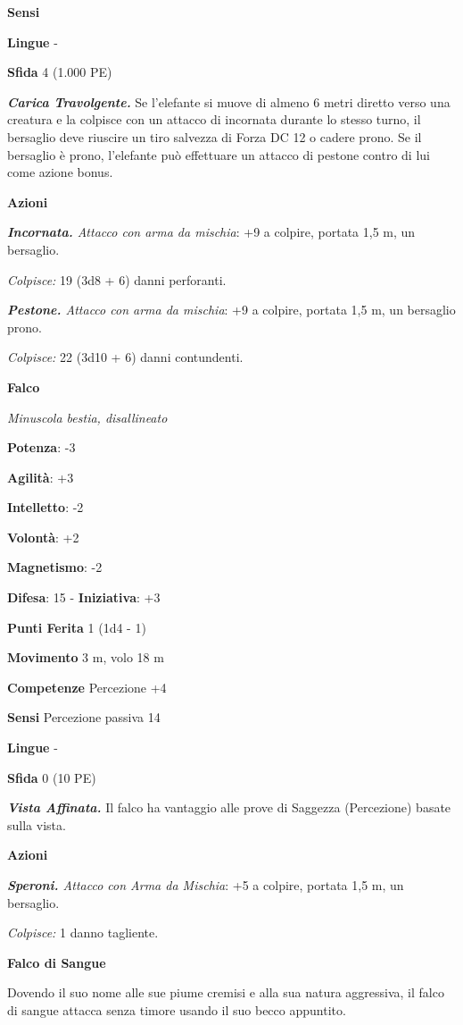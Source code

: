\begin{multicols}{2}
\textbf{Sensi} 

\textbf{Lingue} -

\textbf{Sfida} 4 (1.000 PE)

\emph{\textbf{Carica Travolgente.}} Se l'elefante si muove di almeno 6
metri diretto verso una creatura e la colpisce con un attacco di
incornata durante lo stesso turno, il bersaglio deve riuscire un tiro
salvezza di Forza DC 12 o cadere prono. Se il bersaglio è prono,
l'elefante può effettuare un attacco di pestone contro di lui come
azione bonus.

\textbf{Azioni}

\emph{\textbf{Incornata.} Attacco con arma da mischia}: +9 a colpire,
portata 1,5 m, un bersaglio.

\emph{Colpisce:} 19 (3d8 + 6) danni perforanti.

\emph{\textbf{Pestone.} Attacco con arma da mischia}: +9 a colpire,
portata 1,5 m, un bersaglio prono.

\emph{Colpisce:} 22 (3d10 + 6) danni contundenti.

\textbf{Falco}

\emph{Minuscola bestia, disallineato}

\textbf{Potenza}: -3

\textbf{Agilità}: +3

\textbf{Intelletto}: -2

\textbf{Volontà}: +2

\textbf{Magnetismo}: -2

\textbf{Difesa}: 15 - \textbf{Iniziativa}: +3

\textbf{Punti Ferita} 1 (1d4 - 1)

\textbf{Movimento} 3 m, volo 18 m

\textbf{Competenze} Percezione +4

\textbf{Sensi} Percezione passiva 14

\textbf{Lingue} -

\textbf{Sfida} 0 (10 PE)

\emph{\textbf{Vista Affinata.}} Il falco ha vantaggio alle prove di
Saggezza (Percezione) basate sulla vista.

\textbf{Azioni}

\emph{\textbf{Speroni.} Attacco con Arma da Mischia}: +5 a colpire,
portata 1,5 m, un bersaglio.

\emph{Colpisce:} 1 danno tagliente.

\textbf{Falco di Sangue}

Dovendo il suo nome alle sue piume cremisi e alla sua natura aggressiva,
il falco di sangue attacca senza timore usando il suo becco appuntito.


\end{multicols}
